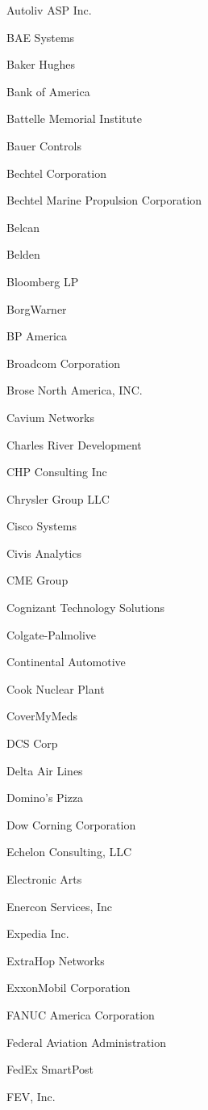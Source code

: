 \documentclass[twoside]{article}
\begin{document}
\begin{center}
\begin{multicols}{5}
\begin{FlushLeft}
\begin{compactitem}
\item Autoliv ASP Inc.
\item BAE Systems
\item Baker Hughes
\item Bank of America
\item Battelle Memorial Institute
\item Bauer Controls
\item Bechtel Corporation
\item Bechtel Marine Propulsion Corporation
\item Belcan
\item Belden
\item Bloomberg LP
\item BorgWarner
\item BP America
\item Broadcom Corporation
\item Brose North America, INC.
\item Cavium Networks
\item Charles River Development
\item CHP Consulting Inc
\item Chrysler Group LLC
\item Cisco Systems
\item Civis Analytics
\item CME Group
\item Cognizant Technology Solutions
\item Colgate-Palmolive
\item Continental Automotive
\item Cook Nuclear Plant
\item CoverMyMeds
\item DCS Corp
\item Delta Air Lines
\item Domino's Pizza
\item Dow Corning Corporation
\item Echelon Consulting, LLC
\item Electronic Arts
\item Enercon Services, Inc
\item Expedia Inc.
\item ExtraHop Networks
\item ExxonMobil Corporation
\item FANUC America Corporation
\item Federal Aviation Administration
\item FedEx SmartPost
\item FEV, Inc.

\end{compactitem}
\end{FlushLeft}
\end{multicols}
\end{center}
\end{document}
